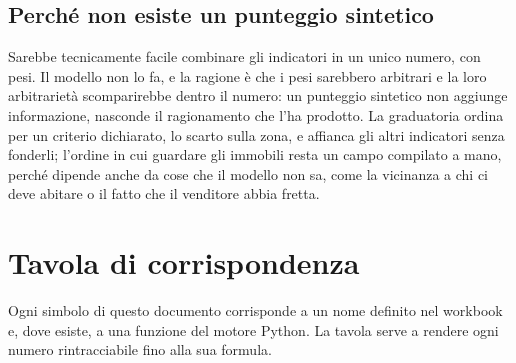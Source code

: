 \documentclass[11pt,a4paper]{article}
\theoremstyle{definition}
\theoremstyle{plain}
\begin{document}
\subsection{Perché non esiste un punteggio sintetico}

Sarebbe tecnicamente facile combinare gli indicatori in un unico numero, con pesi. Il modello non lo fa, e la ragione è che i pesi sarebbero arbitrari e la loro arbitrarietà scomparirebbe dentro il numero: un punteggio sintetico non aggiunge informazione, nasconde il ragionamento che l'ha prodotto. La graduatoria ordina per un criterio dichiarato, lo scarto sulla zona, e affianca gli altri indicatori senza fonderli; l'ordine in cui guardare gli immobili resta un campo compilato a mano, perché dipende anche da cose che il modello non sa, come la vicinanza a chi ci deve abitare o il fatto che il venditore abbia fretta.

\appendix

\section{Tavola di corrispondenza}

Ogni simbolo di questo documento corrisponde a un nome definito nel workbook e, dove esiste, a una funzione del motore Python. La tavola serve a rendere ogni numero rintracciabile fino alla sua formula.
\end{document}
